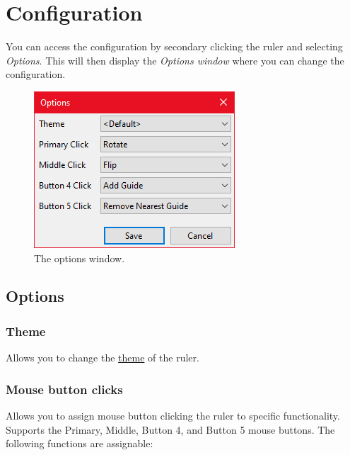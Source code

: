 \documentclass[
]{book}
\begin{document}
\chapter{Configuration}\label{config}

You can access the configuration by secondary clicking the ruler and selecting \emph{Options}.
This will then display the \emph{Options window} where you can change the configuration.

\begin{figure}
\includegraphics[width=1\linewidth]{images/options} \caption{The options window.}\label{fig:unnamed-chunk-4}
\end{figure}

\section{Options}\label{options}

\subsection{Theme}\label{theme}

Allows you to change the \hyperref[themes]{theme} of the ruler.

\subsection{Mouse button clicks}\label{mouse-button-clicks}

Allows you to assign mouse button clicking the ruler to specific functionality.
Supports the Primary, Middle, Button 4, and Button 5 mouse buttons.
The following functions are assignable:
\end{document}
